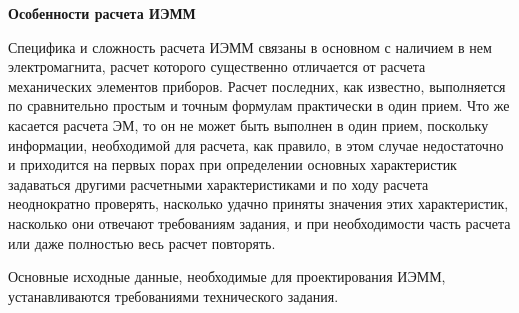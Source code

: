 \begin{flushleft}
\textbf{Особенности расчета ИЭММ}
\end{flushleft}

Специфика и сложность расчета ИЭММ связаны в основном с наличием в нем электромагнита, расчет которого существенно отличается от расчета механических элементов приборов. Расчет последних, как известно, выполняется по сравнительно простым и точным формулам практически в один прием. Что же касается расчета ЭМ, то он не может быть выполнен в один прием, поскольку информации, необходимой для расчета, как правило, в этом случае недостаточно и приходится на первых порах при определении основных характеристик задаваться другими расчетными характеристиками и по ходу расчета неоднократно проверять, насколько удачно приняты значения этих характеристик, насколько они отвечают требованиям задания, и при необходимости часть расчета или даже полностью весь расчет повторять.

Основные исходные данные, необходимые для проектирования ИЭММ, устанавливаются требованиями технического задания. 

